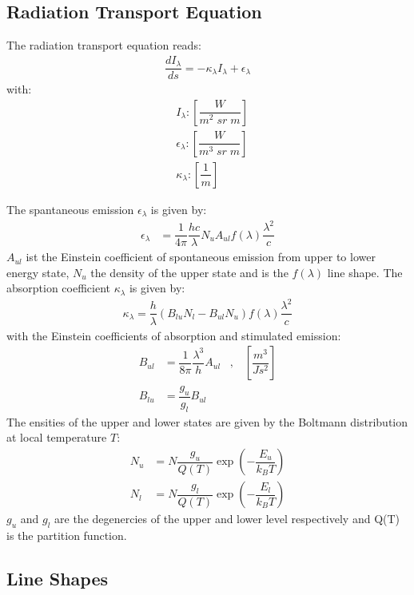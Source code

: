 \subsection{Radiation Transport Equation}

The radiation transport equation reads:
\begin{align}
	\label{eqn1}
	\dfrac{d I_{\lambda}}{ds} = - \kappa_\lambda I_{\lambda} + 	\epsilon_\lambda
\end{align}
with:
\begin{align*}
	&I_{\lambda}    : \left[\dfrac{W}{m^2 \; sr \; m}\right] \\
	&\epsilon_{\lambda} : \left[\dfrac{W}{m^3 \; sr \; m}\right] \\
	&\kappa_{\lambda}   : \left[\dfrac{1}{m}\right]
\end{align*}

The spantaneous emission $\epsilon_\lambda$ is given by:
\begin{align}
	\epsilon_\lambda &= \dfrac{1}{4 \pi} \dfrac{h c}{\lambda} N_u A_{ul} f(\lambda)
	 \dfrac{\lambda^2}{c}
\end{align}
$A_{ul}$ ist the Einstein coefficient of spontaneous emission from upper to lower energy state, $N_u$ the density of the upper state and is the
$f(\lambda)$ line shape. The absorption coefficient $\kappa_\lambda$ is given by:
\begin{align}
	\kappa_\lambda  = \dfrac{h}{\lambda}  \left(  B_{lu} N_l -  B_{ul} N_u \right) f(\lambda)
	 \dfrac{\lambda^2}{c}
\end{align}
with the Einstein coefficients of absorption and stimulated emission:
\begin{align}
	B_{ul} &= \dfrac{1}{8 \pi} \dfrac{\lambda^3}{h} A_{ul} \;\;\; , \;\;\; \left[\dfrac{m^3}{J s^2}\right] \\
	B_{lu} &= \dfrac{g_u}{g_l} B_{ul}
\end{align}
The ensities of the upper and lower states are given by the Boltmann distribution at local temperature $T$:
\begin{align}
	N_u &= N \dfrac{g_u}{Q(T)} \exp\left(- \dfrac{E_u}{k_B T} \right) \\
	N_l &= N \dfrac{g_l}{Q(T)} \exp\left(- \dfrac{E_l}{k_B T} \right)
\end{align}
$g_u$ and $g_l$ are the degenercies of the upper and lower level respectively and Q(T) is the partition function.


\subsection{Line Shapes}

